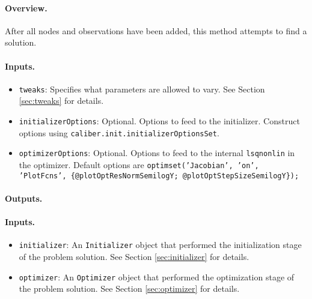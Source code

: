 \paragraph{Overview.}
After all nodes and observations have been added, this method attempts 
to find a solution.
\paragraph{Inputs.}
\begin{itemize}
	\item \texttt{tweaks}: Specifies what parameters are allowed to vary. 
		See Section \ref{sec:tweaks} for details.
	\item \texttt{initializerOptions}: Optional. 
		Options to feed to the initializer. Construct options using 
		\texttt{caliber.init.initializerOptionsSet}.
	\item \texttt{optimizerOptions}: Optional. 
		Options to feed to the internal \texttt{lsqnonlin} in the optimizer.
		Default options are \texttt{optimset('Jacobian', 'on', 'PlotFcns',
		 \{@plotOptResNormSemilogY; @plotOptStepSizeSemilogY\});}
\end{itemize}
\paragraph{Outputs.}
\paragraph{Inputs.}
\begin{itemize}
	\item \texttt{initializer}: An \texttt{Initializer} object that performed the initialization 
	stage of the problem solution. 
	See Section \ref{sec:initializer} for details.
	\item \texttt{optimizer}: An \texttt{Optimizer} object that performed the optimization 
	stage of the problem solution. 
	See Section \ref{sec:optimizer} for details.
\end{itemize}

